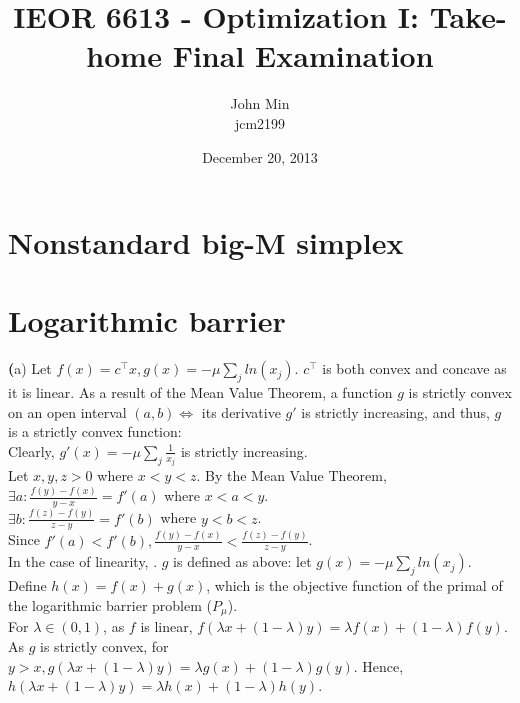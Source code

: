\documentclass{article}
\begin{document}
\title{IEOR 6613 - Optimization I: Take-home Final Examination}

\author{John Min\\ jcm2199}
\date{December 20, 2013}
\maketitle

\section{Nonstandard big-M simplex}


\section{Logarithmic barrier}

\textbf(a)
Let $f(x) = c^\top x, g(x) = - \mu \sum_j ln(x_j)$.  $c^\top $ is both convex and concave as it is linear.   As a result of the Mean Value Theorem, a function $g$ is strictly convex on an open interval $(a,b) \Leftrightarrow$ its derivative $g'$ is strictly increasing, and thus, $g$ is a strictly convex function: \\

\noindent
Clearly, $g'(x) = -\mu \sum_j  \frac{1}{x_j}$ is strictly increasing.\\

\noindent
Let $x,y,z > 0$ where $x < y < z$.  By the Mean Value Theorem, \\
$\exists a : \frac{f(y) - f(x)}{y - x} = f'(a)$ where $x < a < y$. \\
$ \exists b: \frac{f(z) - f(y)}{z - y} = f'(b)$ where $y < b < z$. \\

\noindent
Since $f'(a) < f'(b), \frac{f(y) - f(x)}{y - x} < \frac{f(z) - f(y)}{z - y}$. \\

\noindent
In the case of linearity, .
$g$ is defined as above:  let $g(x) = - \mu \sum_j ln(x_j)$.  Define $h(x) = f(x) + g(x)$, which is the objective function of the primal of the logarithmic barrier problem ($P_\mu$).  \\

\noindent
For $\lambda \in (0,1)$, as $f$ is linear, $f(\lambda x + (1-\lambda) y) = \lambda f(x) + (1-\lambda) f(y)$.  As $g$ is strictly convex, for $y > x, g(\lambda x + (1-\lambda) y) = \lambda g(x) + (1-\lambda) g(y)$.  Hence, $h(\lambda x + (1-\lambda) y) = \lambda h(x) + (1-\lambda) h(y)$. \\
\end{document}
